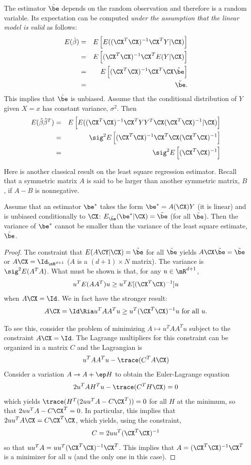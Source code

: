 The estimator $\hat\be$ depends on the random observation and
therefore is a random variable. Its expectation can be computed {\em
under the assumption that the linear model is valid} as follows:  
\begin{eqnarray*}
E(\hat \beta) &=& E\left[E((\CX^T\CX)^{-1} \CX^T Y|\CX)\right]\\
&=& E\left[(\CX^T\CX)^{-1} \CX^T E(Y|\CX)\right]\\
&=& E\left[(\CX^T\CX)^{-1} \CX^T \CX\tilde\be \right]\\
&=& \tilde\be.
\end{eqnarray*}
This implies that $\hat\be$ is unbiased. Assume that the conditional distribution of $Y$ given $X=x$ has
constant variance, $\sigma^2$. Then
\begin{eqnarray*}
E(\hat \beta \hat\beta^T) &=& E\left[E((\CX^T\CX)^{-1} \CX^T YY^T\CX(\CX^T\CX)^{-1} |\CX)\right]\\
&=& \sig^2 E\left[(\CX^T\CX)^{-1} \CX^T \CX(\CX^T\CX)^{-1} \right]\\
&=& \sig^2 E\left[(\CX^T\CX)^{-1} \right]\\
\end{eqnarray*}

Here is another classical result on the least square regression
estimator. Recall that a symmetric matrix $A$ is said to be larger than another
symmetric matrix, $B$, if $A-B$ is nonnegative.
\begin{theorem}
Assume that an estimator $\be^* $ takes the form $\be^* = A(\CX)Y$ (it is
linear) and is unbiased conditionally to $\CX$: $E_{\tilde \be}(\be^*|\CX) =
\tilde \be$ (for all $\tilde \be$).
Then the variance of $\be^*$ cannot be smaller than the variance
of the least square estimate, $\hat\be$.
\end{theorem}
\begin{proof}
The constraint
that $E(A\CY|\CX) = \tilde\be$ for all $\tilde\be$ yields $A\CX \tilde\be = \tilde\be$
or $A\CX = \Id_{\mR^{d+1}}$ ($A$ is a $(d+1) \times N$ matrix). The variance is $\sig^2 E(A^TA)$. What
must be shown is that, for any $u\in\mR^{d+1}$, 
$$ u^T E(AA^T)  u \geq u^TE[(\CX^T\CX)^{-1}] u$$
when $A\CX = \Id$. We in fact have the stronger result: 
$$
A\CX = \Id \Ria u^T AA^T  u \geq u^T(\CX^T\CX)^{-1} u \text{ for all }
u.
$$

To see this, consider the problem of minimizing  $A \mapsto u^T AA^T
u$ subject to the constraint $A\CX = \Id$. The Lagrange multipliers for
this constraint can be organized in a matrix $C$ and the
Lagrangian is
$$ u^T AA^T u - \trace(C^T A\CX)$$
Consider a variation $A\to A+ \ep H$ to obtain the Euler-Lagrange equation
$$ 2 u^T AH^T u - \trace(C^T H\CX) = 0$$
which yields $\trace(H^T (2 uu^TA - C \CX^T)) = 0$ for all $H$ at the
minimum, so that $2 uu^TA - C \CX^T = 0$. In
particular, this implies that 
$2 uu^TA\CX =   C \CX^T\CX$, which yields, using the constraint,
$$
C  = 2 uu^T (\CX^T\CX)^{-1}
$$
so that
$uu^TA = uu^T (\CX^T\CX)^{-1} \CX^T$.
This implies that $A = (\CX^T\CX)^{-1} \CX^T$ is a minimizer for all
$u$ (and the only one in this case).
\end{proof}

